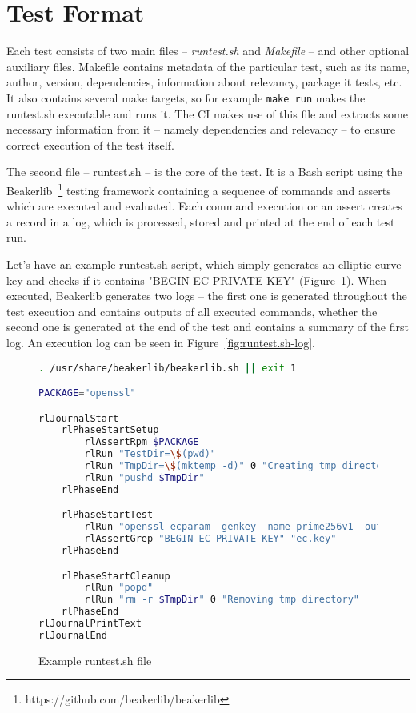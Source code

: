\section{Test Format}
    Each test consists of two main files -- \textit{runtest.sh} and \textit{Makefile}
    -- and other optional auxiliary files. Makefile contains metadata of the
    particular test, such as its name, author, version, dependencies, information
    about relevancy, package it tests, etc. It also contains several make
    targets, so for example \texttt{make run} makes the runtest.sh executable
    and runs it. The CI makes use of this file and extracts some necessary
    information from it -- namely dependencies and relevancy -- to ensure
    correct execution of the test itself.

    The second file -- runtest.sh -- is the core of the test. It is a Bash
    script using the Beakerlib~\footnote{https://github.com/beakerlib/beakerlib}
    testing framework containing a sequence of commands and asserts which
    are executed and evaluated. Each command execution or an assert
    creates a record in a log, which is processed, stored and printed at the end of
    each test run.

    Let's have an example runtest.sh script, which simply generates an elliptic
    curve key and checks if it contains "BEGIN EC PRIVATE KEY"
    (Figure~\ref{fig:runtest.sh}). When executed, Beakerlib generates two
    logs -- the first one is generated throughout the test execution and contains
    outputs of all executed commands, whether the second one is generated at
    the end of the test and contains a summary of the first log. An execution
    log can be seen in Figure~\ref{fig:runtest.sh-log}.

    \begin{figure}
        \begin{lstlisting}[language=Bash,basicstyle=\small]
. /usr/share/beakerlib/beakerlib.sh || exit 1

PACKAGE="openssl"

rlJournalStart
    rlPhaseStartSetup
        rlAssertRpm $PACKAGE
        rlRun "TestDir=\$(pwd)"
        rlRun "TmpDir=\$(mktemp -d)" 0 "Creating tmp directory"
        rlRun "pushd $TmpDir"
    rlPhaseEnd

    rlPhaseStartTest
        rlRun "openssl ecparam -genkey -name prime256v1 -out ec.key"
        rlAssertGrep "BEGIN EC PRIVATE KEY" "ec.key"
    rlPhaseEnd

    rlPhaseStartCleanup
        rlRun "popd"
        rlRun "rm -r $TmpDir" 0 "Removing tmp directory"
    rlPhaseEnd
rlJournalPrintText
rlJournalEnd
        \end{lstlisting}
        \caption{Example runtest.sh file} \label{fig:runtest.sh}
    \end{figure}

